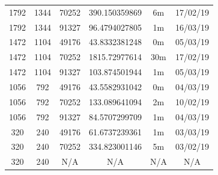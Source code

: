 \documentclass[11pt,a4paper]{report}
\begin{document}
\begin{itemize}
\begin{center}
\begin{tabular}{ c c c | c c c }
  1792 & 1344 & 70252 & 390.150359869 & 6m & 17/02/19 \\
  1792 & 1344 & 91327 & 96.4794027805 & 1m & 16/03/19 \\
  1472 & 1104 & 49176 & 43.8332381248 & 0m & 05/03/19 \\
  1472 & 1104 & 70252 & 1815.72977614 & 30m & 17/02/19 \\
  1472 & 1104 & 91327 & 103.874501944 & 1m & 05/03/19 \\
  1056 & 792 & 49176 & 43.5582931042 & 0m & 04/03/19 \\
  1056 & 792 & 70252 & 133.089641094 & 2m & 10/02/19 \\
  1056 & 792 & 91327 & 84.5707299709 & 1m & 04/03/19 \\
  320 & 240 & 49176 & 61.6737239361 & 1m & 03/03/19 \\
  320 & 240 & 70252 & 334.823001146 & 5m & 03/02/19 \\
  320 & 240 & N/A & N/A & N/A & N/A \\
  \end{tabular}
  \end{center}


\end{itemize}
\end{document}
